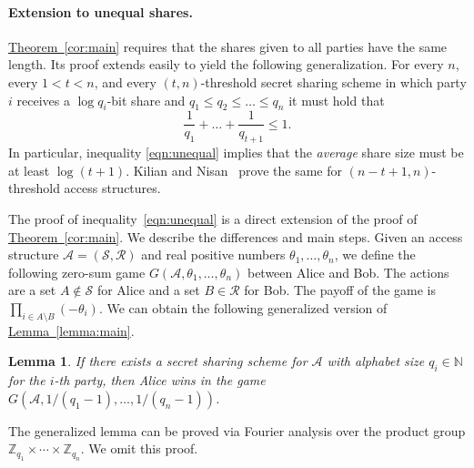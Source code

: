 \documentclass[11pt]{article}
\numberwithin{equation}{section}
\newtheorem{lemma}[theorem]{Lemma}
\theoremstyle{definition}
\theoremstyle{plain}
\newcommand{\Z}{\mathbb Z}
\newcommand{\expref}[2]{\hyperref[#2]{#1~\ref{#2}}}
\def\calA{\mathcal{A}}
\def\calS{\mathcal{S}}
\def\calR{\mathcal{R}}
\begin{document}
\paragraph{Extension to unequal shares.}
\expref{Theorem}{cor:main} requires that the shares given to all parties have the same length. Its proof extends easily to yield the following
generalization.  %
For every $n$, every $1 < t < n$, and every $(t, n)$-threshold secret sharing scheme in which party $i$ receives a $\log q_i$-bit share and $q_1 \leq q_2 \leq \dots \leq q_n$ it must hold that
\begin{equation}
\label{eqn:unequal}
\frac{1}{q_1} + \dots + \frac{1}{q_{t+1}} \leq 1.
\end{equation}
In particular, inequality \eqref{eqn:unequal} implies that the \emph{average}
share size must be at least $\log{(t+1)}$.   Kilian and Nisan~\cite{KilianN90}
prove the same for $(n - t + 1, n)$-threshold access structures.

The proof of inequality~\eqref{eqn:unequal} is a direct extension of the proof of \expref{Theorem}{cor:main}.     We describe the differences and main steps.
Given an access structure $\calA = (\calS, \calR)$ and
real positive numbers $\theta_1,\dots, \theta_n$, we define the following zero-sum game $G(\calA, \theta_1,\dots,\theta_n)$ between Alice and Bob. The actions are a set $A \not\in \calS$ for Alice and a set $B
\in \calR$ for Bob.  The payoff of the game is $\prod_{i \in A \setminus B} (-\theta_i)$.  
We can obtain the following generalized version of \expref{Lemma}{lemma:main}.

\begin{lemma}
\label{lemma:main_ave}
If there exists a secret sharing scheme for $\calA$ with alphabet size $q_i\in\mathbb{N}$ for the $i$-th party,  then Alice wins in the game $G(\calA, 1/(q_1-1),\dots,1/(q_n-1))$.
\end{lemma}

The generalized lemma can be proved via Fourier analysis over the product group $\Z_{q_1} \times \cdots \times \Z_{q_n}$.    We omit this proof.
\end{document}
